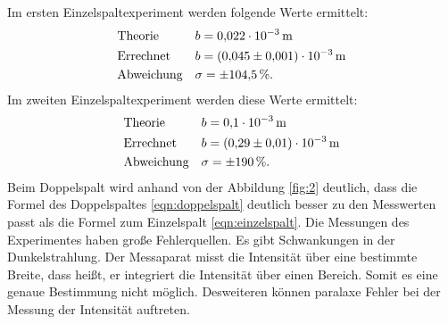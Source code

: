 Im ersten Einzelspaltexperiment werden folgende Werte ermittelt:
\begin{align*}
  &\text{Theorie}&&b=\SI{0,022e-3}{m}\\
  &\text{Errechnet}&&b=\SI{0,045\pm0,001e-3}{m}\\
  &\text{Abweichung}&&\sigma = \pm\SI{104,5}{\percent}.
\end{align*}
Im zweiten Einzelspaltexperiment werden diese Werte ermittelt:
\begin{align*}
  &\text{Theorie}&&b=\SI{0,1e-3}{m}\\
  &\text{Errechnet}&&b=\SI{0.29\pm0.01e-3}{m}\\
  &\text{Abweichung}&&\sigma = \pm\SI{190}{\percent}.
\end{align*}
Beim Doppelspalt wird anhand von der Abbildung \ref{fig:2} deutlich,
dass die Formel des Doppelspaltes \ref{eqn:doppelspalt} deutlich besser zu den Messwerten passt als die
Formel zum Einzelspalt \ref{eqn:einzelspalt}.
Die Messungen des Experimentes haben große Fehlerquellen.
Es gibt Schwankungen in der Dunkelstrahlung.
Der Messaparat misst die Intensität über eine bestimmte Breite, dass heißt, er integriert die Intensität über einen Bereich.
Somit es eine genaue Bestimmung nicht möglich.
Desweiteren können paralaxe Fehler bei der Messung der Intensität auftreten.
